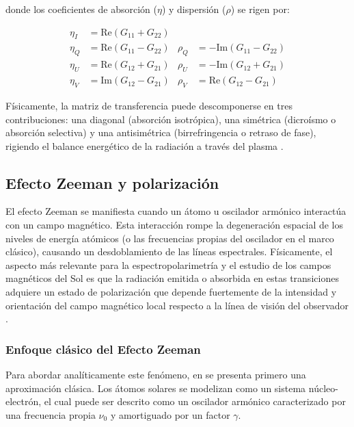 donde los coeficientes de absorción ($\eta$) y dispersión ($\rho$) se rigen por:

\begin{equation}
    \label{eq:definicionDeetaYtho}
    \begin{aligned}
    \eta_I &= \text{Re}(G_{11} + G_{22}) \\
    \eta_Q &= \text{Re}(G_{11} - G_{22}) & \rho_Q &= -\text{Im}(G_{11} - G_{22}) \\
    \eta_U &= \text{Re}(G_{12} + G_{21}) & \rho_U &= -\text{Im}(G_{12} + G_{21}) \\
    \eta_V &= \text{Im}(G_{12} - G_{21}) & \rho_V &= \text{Re}(G_{12} - G_{21})
    \end{aligned}
\end{equation}

Físicamente, la matriz de transferencia puede descomponerse en tres contribuciones: una diagonal (absorción isotrópica), una simétrica (dicroísmo o absorción selectiva) y una antisimétrica (birrefringencia o retraso de fase), rigiendo el balance energético de la radiación a través del plasma \cite[pag. 93]{sanchezSolarObservationsTechniques1992}.

\subsection{Efecto Zeeman y polarización}
El efecto Zeeman se manifiesta cuando un átomo u oscilador armónico interactúa con un campo magnético. Esta interacción rompe la degeneración espacial de los niveles de energía atómicos (o las frecuencias propias del oscilador en el marco clásico), causando un desdoblamiento de las líneas espectrales. Físicamente, el aspecto más relevante para la espectropolarimetría y el estudio de los campos magnéticos del Sol es que la radiación emitida o absorbida en estas transiciones adquiere un estado de polarización que depende fuertemente de la intensidad y orientación del campo magnético local respecto a la línea de visión del observador \cite[pag. 91]{sanchezSolarObservationsTechniques1992}.

\subsubsection{Enfoque clásico del Efecto Zeeman}
Para abordar analíticamente este fenómeno, en \cite[pag. 98]{sanchezSolarObservationsTechniques1992} se presenta primero una aproximación clásica. Los átomos solares se modelizan como un sistema núcleo-electrón, el cual puede ser descrito como un oscilador armónico caracterizado por una frecuencia propia $\nu_0$ y amortiguado por un factor $\gamma$.

